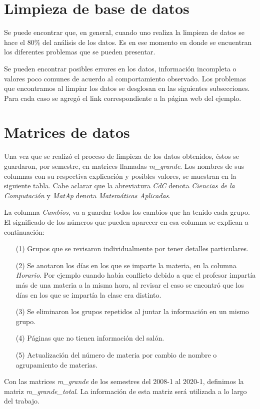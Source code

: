   
  \section{Limpieza de base de datos} \label{sec_ED_LimpiezaDatos}
  
  Se puede encontrar que, en general, cuando uno realiza la limpieza de datos se hace el 80\% del análisis de los datos. Es en ese momento en donde se encuentran los diferentes problemas que se pueden presentar.
  
  Se pueden encontrar posibles errores en los datos, información incompleta o valores poco comunes de acuerdo al comportamiento observado. Los problemas que encontramos al limpiar los datos se desglosan en las siguientes subsecciones. Para cada caso se agregó el link correspondiente a la página web del ejemplo.
  
  
  \section{Matrices de datos}
  
  Una vez que se realizó el proceso de limpieza de los datos obtenidos, éstos se guardaron, por semestre, en matrices llamadas \textit{m\_grande}. Los nombres de sus columnas con su respectiva explicación y posibles valores, se muestran en la siguiente tabla. Cabe aclarar que la abreviatura \textit{CdC} denota \textit{Ciencias de la Computación} y \textit{MatAp} denota \textit{Matemáticas Aplicadas}.
  
  \dfNmatrizGrande %
  
  La columna \textit{Cambios}, va a guardar todos los cambios que ha tenido cada grupo. El significado de los números que pueden aparecer en esa columna se explican a continuación:
  
    \begin{enumerate}
  \item[(1)] Grupos que se revisaron individualmente por tener detalles particulares.
  
  \item[(2)] Se anotaron los días en los que se imparte la materia, en la columna \textit{Horario}. Por ejemplo cuando había conflicto debido a que el profesor impartía más de una materia a la misma hora, al revisar el caso se encontró que los días en los que se impartía la clase era distinto.
  
  \item[(3)] Se eliminaron los grupos repetidos al juntar la información en un mismo grupo.
  
  \item[(4)] Páginas que no tienen información del salón.
  
  \item[(5)] Actualización del número de materia por cambio de nombre o agrupamiento de materias.
  \end{enumerate}
  
  
  Con las matrices \textit{m\_grande} de los semestres del 2008-1 al 2020-1, definimos la matriz \textit{m\_grande\_total}. La información de esta matriz será utilizada a lo largo del trabajo.